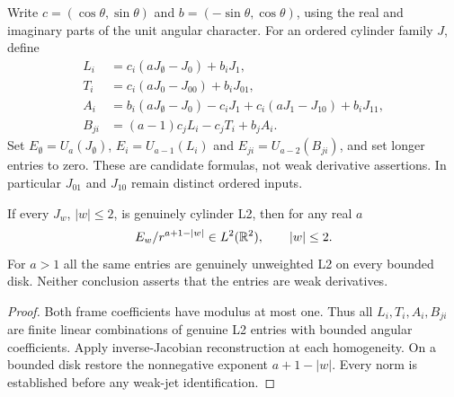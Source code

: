\begin{definition}
\label{def:cylinder-cartesian-jet-candidates}
\leanok
Write $c=(\cos\theta,\sin\theta)$ and $b=(-\sin\theta,\cos\theta)$,
using the real and imaginary parts of the unit angular character.
For an ordered cylinder family $J$, define
\[
\begin{aligned}
 L_i&=c_i(aJ_\emptyset-J_0)+b_iJ_1,\\
 T_i&=c_i(aJ_0-J_{00})+b_iJ_{01},\\
 A_i&=b_i(aJ_\emptyset-J_0)-c_iJ_1+c_i(aJ_1-J_{10})+b_iJ_{11},\\
 B_{ji}&=(a-1)c_jL_i-c_jT_i+b_jA_i.
\end{aligned}
\]
Set $E_\emptyset=U_a(J_\emptyset)$, $E_i=U_{a-1}(L_i)$ and
$E_{ji}=U_{a-2}(B_{ji})$, and set longer entries to zero.
These are candidate formulas, not weak derivative assertions.
In particular $J_{01}$ and $J_{10}$ remain distinct ordered inputs.
\end{definition}

\begin{lemma}
\label{lem:cylinder-cartesian-candidate-norms}
\leanok
If every $J_w$, $|w|\le2$, is genuinely cylinder L2, then for any real $a$
\[
 E_w/r^{a+1-|w|}\in L^2(\mathbb{R}^2),\qquad |w|\le2.
\]
For $a>1$ all the same entries are genuinely unweighted L2 on every bounded
disk. Neither conclusion asserts that the entries are weak derivatives.
\end{lemma}

\begin{proof}
\leanok
Both frame coefficients have modulus at most one.
Thus all $L_i,T_i,A_i,B_{ji}$ are finite linear combinations of genuine L2
entries with bounded angular coefficients.
Apply inverse-Jacobian reconstruction at each homogeneity.
On a bounded disk restore the nonnegative exponent $a+1-|w|$.
Every norm is established before any weak-jet identification.
\end{proof}

